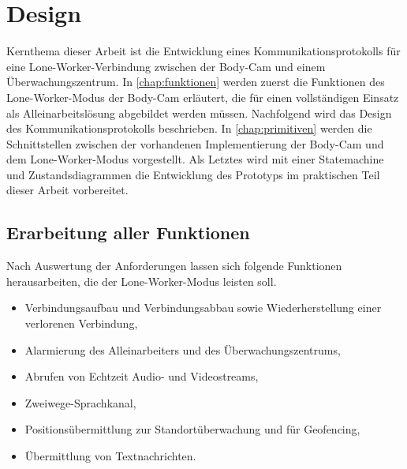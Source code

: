 \documentclass[thesis.tex]{subfiles}
\begin{document}
\chapter{Design}\label{chap:design}

Kernthema dieser Arbeit ist die Entwicklung eines Kommunikationsprotokolls für eine Lone-Worker-Verbindung zwischen der Body-Cam und einem Überwachungszentrum.
In \autoref{chap:funktionen} werden zuerst die Funktionen des Lone-Worker-Modus der Body-Cam erläutert, die für einen vollständigen Einsatz als Alleinarbeitslösung abgebildet werden müssen.
Nachfolgend wird das Design des Kommunikationsprotokolls beschrieben.
In \autoref{chap:primitiven} werden die Schnittstellen zwischen der vorhandenen Implementierung der Body-Cam und dem Lone-Worker-Modus vorgestellt.
Als Letztes wird mit einer Statemachine und Zustandsdiagrammen die Entwicklung des Prototyps im praktischen Teil dieser Arbeit vorbereitet.

\section{Erarbeitung aller Funktionen}\label{chap:funktionen}
Nach Auswertung der Anforderungen lassen sich folgende Funktionen herausarbeiten, die der Lone-Worker-Modus leisten soll.
\begin{itemize}
    \item Verbindungsaufbau und Verbindungsabbau sowie Wiederherstellung einer verlorenen Verbindung,
    \item Alarmierung des Alleinarbeiters und des Überwachungszentrums,
    \item Abrufen von Echtzeit Audio- und Videostreams,
    \item Zweiwege-Sprachkanal,
    \item Positionsübermittlung zur Standortüberwachung und für Geofencing,
    \item Übermittlung von Textnachrichten.
\end{itemize}
\end{document}
